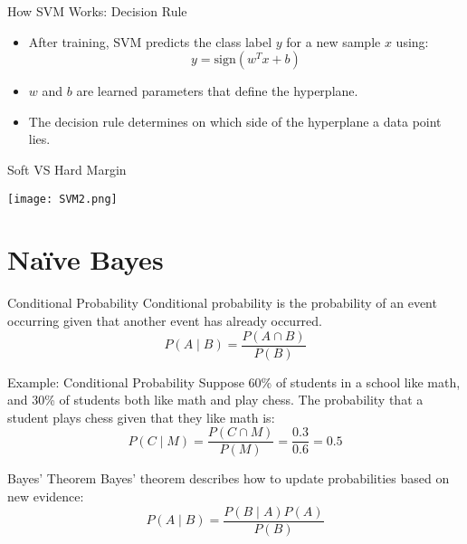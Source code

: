 \documentclass[serif, aspectratio=169]{beamer}
\begin{document}
\begin{frame}{How SVM Works: Decision Rule}
    \begin{itemize}
        \item After training, SVM predicts the class label \( y \) for a new sample \( x \) using:
        \[
        y = \text{sign}(w^T x + b)
        \]
        \item \( w \) and \( b \) are learned parameters that define the hyperplane.
        \item The decision rule determines on which side of the hyperplane a data point lies.
    \end{itemize}
\end{frame}

\begin{frame}{Soft VS Hard Margin}
    
    \centering
    \texttt{[image: SVM2.png]}
\end{frame}

\section{Naïve Bayes}

\begin{frame}{Conditional Probability}
    Conditional probability is the probability of an event occurring given that another event has already occurred.
    \begin{equation}
        P(A \mid B) = \frac{P(A \cap B)}{P(B)}
    \end{equation}
\end{frame}

\begin{frame}{Example: Conditional Probability}
    Suppose 60\% of students in a school like math, and 30\% of students both like math and play chess.
    The probability that a student plays chess given that they like math is:
    \begin{equation}
        P(C \mid M) = \frac{P(C \cap M)}{P(M)} = \frac{0.3}{0.6} = 0.5
    \end{equation}
\end{frame}

\begin{frame}{Bayes' Theorem}
    Bayes' theorem describes how to update probabilities based on new evidence:
    \begin{equation}
        P(A \mid B) = \frac{P(B \mid A) P(A)}{P(B)}
    \end{equation}
\end{frame}
\end{document}
